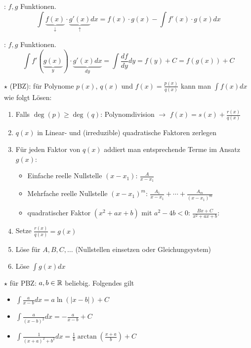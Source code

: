 \Satz {}: $f, g$ Funktionen.
$$\int \underbrace{f(x)}_{\downarrow}\cdot\underbrace{g'(x)}_{\uparrow} dx = f(x) \cdot g(x) - \int f'(x) \cdot g(x) dx$$

\Satz {}: $f, g$ Funktionen.
$$\int f'(\underbrace{g(x)}_y) \cdot \underbrace{g'(x) dx}_{dy} = \int \frac{df}{dy} dy = f(y) + C = f(g(x)) + C$$

\Satz $\star$  (PBZ): für Polynome $p(x)$, $q(x)$ und $f(x) = \frac{p(x)}{q(x)}$
kann man $\displaystyle \int f(x) dx$ wie folgt Lösen:
\vspace{-0.6em}
\begin{enumerate}
    \item Falls $\deg(p) \ge \deg(q)$: Polynomdivision $\to$ $f(x) = s(x) + \frac{r(x)}{q(x)}$
    \item $q(x)$ in Linear- und (irreduzible) quadratische Faktoren zerlegen
    \item Für jeden Faktor von $q(x)$ addiert man entsprechende Terme im Ansatz $g(x)$:
    \begin{itemize}
        \item Einfache reelle Nullstelle $(x - x_1)$: $\frac{A}{x - x_1}$
        \item Mehrfache reelle Nullstelle $(x -x_1)^m$: $\frac{A_1}{x - x_1} + \cdots + \frac{A_m}{(x - x_1)^m}$
        \item quadratischer Faktor $(x^2 + ax + b)$ mit $a^2 - 4b < 0$: $\frac{Bx + C}{x^2 + ax + b}$:
    \end{itemize}
    \item Setze $\frac{r(x)}{q(x)} = g(x)$
    \item Löse für $A, B, C, \ldots$ (Nullstellen einsetzen oder Gleichungsystem)
    \item Löse $\displaystyle \int g(x) dx$
\end{enumerate}

\Satz $\star$  für PBZ: $a, b \in \mathbb{R}$ beliebig. Folgendes gilt
\vspace{-0.6em}
\begin{itemize}
    \item $\displaystyle \int \frac{a}{x - b} dx = a \ln(|x - b|) + C$
    \item $\displaystyle \int \frac{a}{(x - b)^2} dx = -\frac{a}{x-b} + C$
    \item $\displaystyle \int \frac{1}{(x + a)^2 + b^2} dx = \frac{1}{b} \arctan(\frac{x + a}{b}) + C$
\end{itemize}

